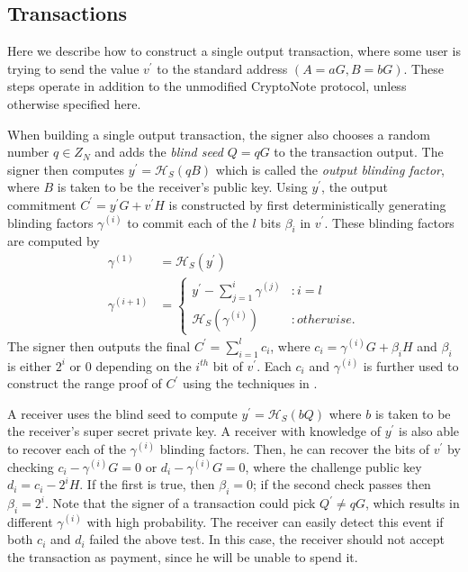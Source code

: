 \documentclass{article}
\newcommand{\oy}{\ensuremath{y^\prime}}
\newcommand{\oC}{\ensuremath{C^\prime}}
\newcommand{\ov}{\ensuremath{v^\prime}}
\newcommand{\hs}{\ensuremath{\mathcal{H}_S}}
\begin{document}
\subsection{Transactions}

Here we describe how to construct a single output transaction, where some user
is trying to send the value {\ov} to the standard address $(A=aG, B=bG)$.  These
steps operate in addition to the unmodified CryptoNote protocol, unless
otherwise specified here.

When building a single output transaction, the signer also chooses a random
number $q \in Z_N$ and adds the {\em blind seed} $Q=qG$ to the transaction
output.  The signer then computes $\oy = \hs(qB)$ which is called the {\em
output blinding factor}, where $B$ is taken to be the receiver's public key.
Using $\oy$, the output commitment $\oC = \oy G + \ov H$ is constructed by first
deterministically generating blinding factors $\gamma^{(i)}$ to commit each of
the $l$ bits $\beta_i$ in {\ov}.  These blinding factors are computed by
\begin{align*}
  \gamma^{(1)} &= \hs(\oy) \\
  \gamma^{(i+1)} &= 
    \begin{cases}
      \oy - \sum_{j=1}^{i} \gamma^{(j)} &: i=l \\
      \hs(\gamma^{(i)}) &: otherwise.
    \end{cases}
\end{align*}
The signer then outputs the final $\oC = \sum_{i=1}^l c_i$, where $c_i =
\gamma^{(i)} G + \beta_i H$ and $\beta_i$ is either $2^i$ or 0 depending on the
$i^{th}$ bit of {\ov}.  Each $c_i$ and $\gamma^{(i)}$ is further used to
construct the range proof of $\oC$ using the techniques in \cite{MP15}.

A receiver uses the blind seed to compute $\oy = \hs(bQ)$ where $b$ is taken to
be the receiver's super secret private key.  A receiver with knowledge of $\oy$
is also able to recover each of the $\gamma^{(i)}$ blinding factors.  Then, he
can recover the bits of {\ov} by checking $c_i - \gamma^{(i)} G = 0$ or $d_i -
\gamma^{(i)} G = 0$, where the challenge public key $d_i = c_i - 2^i H$.  If the
first is true, then $\beta_i=0$; if the second check passes then $\beta_i=2^i$.
Note that the signer of a transaction could pick $Q^\prime \neq qG$, which
results in different $\gamma^{(i)}$ with high probability.  The receiver can
easily detect this event if both $c_i$ and $d_i$ failed the above test.  In this
case, the receiver should not accept the transaction as payment, since he will
be unable to spend it.
\end{document}
